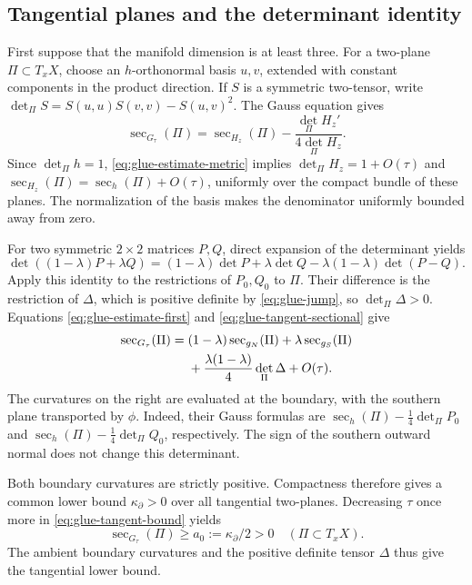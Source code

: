 \documentclass[12pt]{amsart}
\numberwithin{equation}{section}
\theoremstyle{remark}
\newcommand{\Ksec}{\operatorname{sec}}
\begin{document}
\subsection{Tangential planes and the determinant identity}
First suppose that the manifold dimension is at least three.
For a two-plane \(\Pi\subset T_xX\), choose an \(h\)-orthonormal
basis \(u,v\), extended with constant components in the product
direction. If \(S\) is a symmetric two-tensor, write
\(\det_\Pi S=S(u,u)S(v,v)-S(u,v)^2\). The Gauss equation gives
\begin{equation}\label{eq:glue-tangent-sectional}
 \Ksec_{G_\tau}(\Pi)
 =\Ksec_{H_z}(\Pi)
       -\frac{\det_\Pi H_z'}{4\det_\Pi H_z}.
\end{equation}
Since \(\det_\Pi h=1\),
\eqref{eq:glue-estimate-metric} implies
\(\det_\Pi H_z=1+O(\tau)\) and
\(\Ksec_{H_z}(\Pi)=\Ksec_h(\Pi)+O(\tau)\), uniformly over
the compact bundle of these planes. The normalization of the
basis makes the denominator uniformly bounded away from zero.

For two symmetric \(2\times2\) matrices \(P,Q\), direct
expansion of the determinant yields
\begin{equation}\label{eq:glue-determinant}
 \det((1-\lambda)P+\lambda Q)
 =(1-\lambda)\det P+\lambda\det Q
       -\lambda(1-\lambda)\det(P-Q).
\end{equation}
Apply this identity to the restrictions of \(P_0,Q_0\) to
\(\Pi\). Their difference is the restriction of \(\Delta\),
which is positive definite by \eqref{eq:glue-jump}, so
\(\det_\Pi\Delta>0\). Equations
\eqref{eq:glue-estimate-first} and
\eqref{eq:glue-tangent-sectional} give
\begin{align}
 \Ksec_{G_\tau}(\Pi)
 ={}&(1-\lambda)\Ksec_{g_N}(\Pi)
        +\lambda\Ksec_{g_S}(\Pi)\notag\\
 &+\frac{\lambda(1-\lambda)}4\det_\Pi\Delta+O(\tau).
 \label{eq:glue-tangent-bound}
\end{align}
The curvatures on the right are evaluated at the boundary,
with the southern plane transported by \(\phi\). Indeed,
their Gauss formulas are
\(\Ksec_h(\Pi)-\tfrac14\det_\Pi P_0\) and
\(\Ksec_h(\Pi)-\tfrac14\det_\Pi Q_0\), respectively.
The sign of the southern outward normal does not change this
determinant.

Both boundary curvatures are strictly positive. Compactness
therefore gives a common lower bound \(\kappa_\partial>0\)
over all tangential two-planes. Decreasing \(\tau\) once more
in \eqref{eq:glue-tangent-bound} yields
\begin{equation}\label{eq:glue-tangent-reserve}
 \Ksec_{G_\tau}(\Pi)\ge
 a_0:=\kappa_\partial/2>0
 \quad(\Pi\subset T_xX).
\end{equation}
The ambient boundary curvatures and the positive definite tensor
\(\Delta\) thus give the tangential lower bound.
\end{document}
